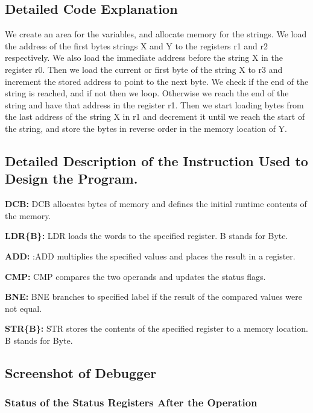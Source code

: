 \documentclass{article}
\begin{document}
\subsection{Detailed Code Explanation}
We create an area for the variables, and allocate memory for the strings. We load the address of the first bytes strings X and Y to the registers r1 and r2 respectively. We also load the immediate address before the string X in the register r0. Then we load the current or first byte of the string X to r3 and increment the stored address to point to the next byte. We check if the end of the string is reached, and if not then we loop. Otherwise we reach the end of the string and have that address in the register r1. Then we start loading bytes from the last address of the string X in r1 and decrement it until we reach the start of the string, and store the bytes in reverse order in the memory location of Y.

\subsection{Detailed Description of the Instruction Used to Design the Program.}

\item \textbf{DCB: }DCB allocates bytes of memory and defines the initial runtime contents of the memory.
\item \textbf{LDR\{B\}: }LDR loads the words to the specified register. B stands for Byte.
\item \textbf{ADD: }:ADD multiplies the specified values and places the result in a register.
\item \textbf{CMP: }CMP compares the two operands and updates the status flags.
\item \textbf{BNE: }BNE branches to specified label if the result of the compared values were not equal.
\item \textbf{STR\{B\}: }STR stores the contents of the specified register to a memory location. B stands for Byte.

\subsection{Screenshot of Debugger}

\subsubsection{Status of the Status Registers After the Operation}
\end{document}

